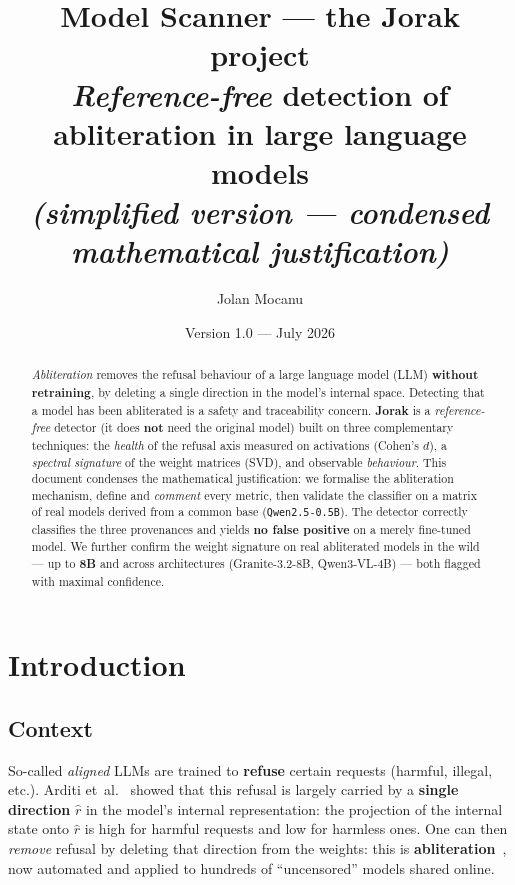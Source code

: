 \documentclass[11pt,a4paper]{article}
\title{\textbf{Model Scanner} — the \textbf{Jorak} project \\[2mm]
\large \emph{Reference-free} detection of abliteration in large language models\\
\normalsize\emph{(simplified version — condensed mathematical justification)}}
\author{Jolan Mocanu}
\date{Version 1.0 --- July 2026}
\theoremstyle{definition}
\theoremstyle{plain}
\newcommand{\rhat}{\hat{r}}
\begin{document}
\maketitle

\begin{abstract}
\noindent
\emph{Abliteration} removes the refusal behaviour of a large language model (LLM)
\textbf{without retraining}, by deleting a single direction in the model's internal
space. Detecting that a model has been abliterated is a safety and traceability
concern. \textbf{Jorak} is a \emph{reference-free} detector (it does \textbf{not}
need the original model) built on three complementary techniques: the \emph{health}
of the refusal axis measured on activations (Cohen's $d$), a \emph{spectral
signature} of the weight matrices (SVD), and observable \emph{behaviour}. This
document condenses the mathematical justification: we formalise the abliteration
mechanism, define and \emph{comment} every metric, then validate the classifier on a
matrix of real models derived from a common base (\texttt{Qwen2.5-0.5B}). The
detector correctly classifies the three provenances and yields \textbf{no false
positive} on a merely fine-tuned model. We further confirm the weight signature on
real abliterated models in the wild --- up to \textbf{8B} and across architectures
(Granite-3.2-8B, Qwen3-VL-4B) --- both flagged with maximal confidence.
\end{abstract}

\tableofcontents
\bigskip

\section{Introduction}

\subsection{Context}
So-called \emph{aligned} LLMs are trained to \textbf{refuse} certain requests
(harmful, illegal, etc.). Arditi et~al.~\cite{arditi2024} showed that this refusal is
largely carried by a \textbf{single direction} $\rhat$ in the model's internal
representation: the projection of the internal state onto $\rhat$ is high for harmful
requests and low for harmless ones. One can then \emph{remove} refusal by deleting
that direction from the weights: this is \textbf{abliteration}~\cite{labonne2024},
now automated and applied to hundreds of ``uncensored'' models shared online.
\end{document}
